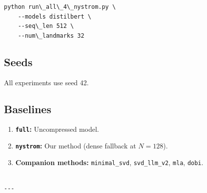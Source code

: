 \begin{lstlisting}
python run\_all\_4\_nystrom.py \
    --models distilbert \
    --seq\_len 512 \
    --num\_landmarks 32
\end{lstlisting}

\subsection{Seeds}

All experiments use seed 42.

\subsection{Baselines}

\begin{enumerate}
\item \textbf{\texttt{full}:} Uncompressed model.
\item \textbf{\texttt{nystrom}:} Our method (dense fallback at $N=128$).
\item \textbf{Companion methods:} \texttt{minimal\_svd}, \texttt{svd\_llm\_v2}, \texttt{mla}, \texttt{dobi}.
\end{enumerate}
\begin{lstlisting}

---
\end{lstlisting}